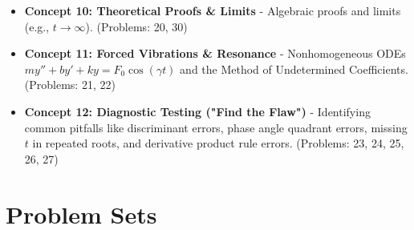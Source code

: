 \documentclass[11pt]{article}
\begin{document}
\begin{itemize}
    \item \textbf{Concept 10: Theoretical Proofs \& Limits} - Algebraic proofs and limits (e.g., $t \to \infty$). (Problems: 20, 30)
    \item \textbf{Concept 11: Forced Vibrations \& Resonance} - Nonhomogeneous ODEs $my'' + by' + ky = F_0\cos(\gamma t)$ and the Method of Undetermined Coefficients. (Problems: 21, 22)
    \item \textbf{Concept 12: Diagnostic Testing ("Find the Flaw")} - Identifying common pitfalls like discriminant errors, phase angle quadrant errors, missing $t$ in repeated roots, and derivative product rule errors. (Problems: 23, 24, 25, 26, 27)
\end{itemize}

\newpage

\section{Problem Sets}
\end{document}

